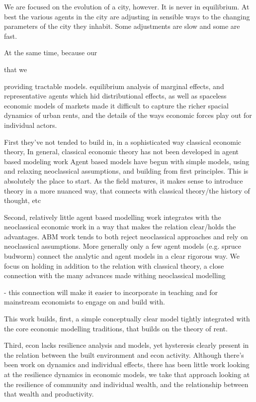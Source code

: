 We are focused on the evolution of a city, however. It is never in equilibrium. At best the various agents in the city are adjusting in sensible ways to the changing parameters of the city they inhabit. Some adjustments are slow and some are fast. 

At the same time, because our  

that we 

providing tractable models.  equilibrium analysis of marginal effects, and representative agents which hid distributional effects, as well as spaceless economic models of markets made it difficult to capture the richer spacial dynamics of urban rents, and the details of the ways economic forces play out for individual actors.

First they've not tended to build in, in a sophisticated way classical economic theory,
In general, classical economic theory has not been developed in agent based modeling work
Agent based models have begun with simple models, using and relaxing neoclassical assumptions, and building from first principles. This is absolutely the place to start. As the field matures, it makes sense to introduce theory in a more nuanced way, that connects with classical theory/the history of thought, etc

Second, relatively little agent based modelling work integrates with the neoclassical economic work in a way that makes the relation clear/holds the advantages. ABM work tends to both reject neoclassical approaches and rely on neoclassical assumptions.
More generally only a few agent models (e.g. spruce budworm) connect the analytic and agent models in a clear rigorous way. We focus on holding in addition to the relation with classical theory, a close connection with the many advances made withing neoclassical modelling

- this connection will make it easier to incorporate in teaching and for mainstream economists to engage on and build with.


This work builds, first, a simple conceptually clear model tightly integrated with the core economic modelling traditions, that builds on the theory of rent.


Third, econ lacks resilience analysis and models, yet hysteresis clearly present in the relation between the built environment and econ activity. Although there's been work on dynamics and individual effects, there has been little work looking at the resilience dynamics in economic models, we take that approach looking at the resilience of community and individual wealth, and the relationship between that wealth and productivity. 


